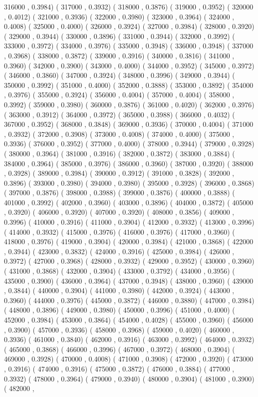 \documentclass[10pt]{article}
\begin{document}
316000 , 0.3984)  ( 317000 , 0.3932)  ( 318000 , 0.3876)  ( 319000 , 0.3952)  ( 320000 , 0.4012)  ( 321000 , 0.3936)  ( 322000 , 0.3980)  ( 323000 , 0.3964)  ( 324000 , 0.4008)  ( 325000 , 0.4000)  ( 326000 , 0.3924)  ( 327000 , 0.3984)  ( 328000 , 0.3920)  ( 329000 , 0.3944)  ( 330000 , 0.3896)  ( 331000 , 0.3944)  ( 332000 , 0.3992)  ( 333000 , 0.3972)  ( 334000 , 0.3976)  ( 335000 , 0.3948)  ( 336000 , 0.3948)  ( 337000 , 0.3968)  ( 338000 , 0.3872)  ( 339000 , 0.3916)  ( 340000 , 0.3816)  ( 341000 , 0.3960)  ( 342000 , 0.3900)  ( 343000 , 0.4000)  ( 344000 , 0.3952)  ( 345000 , 0.3972)  ( 346000 , 0.3860)  ( 347000 , 0.3924)  ( 348000 , 0.3996)  ( 349000 , 0.3944)  ( 350000 , 0.3992)  ( 351000 , 0.4000)  ( 352000 , 0.3888)  ( 353000 , 0.3892)  ( 354000 , 0.3976)  ( 355000 , 0.3924)  ( 356000 , 0.4004)  ( 357000 , 0.4004)  ( 358000 , 0.3992)  ( 359000 , 0.3980)  ( 360000 , 0.3876)  ( 361000 , 0.4020)  ( 362000 , 0.3976)  ( 363000 , 0.3912)  ( 364000 , 0.3972)  ( 365000 , 0.3988)  ( 366000 , 0.4032)  ( 367000 , 0.3952)  ( 368000 , 0.3848)  ( 369000 , 0.3936)  ( 370000 , 0.4004)  ( 371000 , 0.3932)  ( 372000 , 0.3908)  ( 373000 , 0.4008)  ( 374000 , 0.4000)  ( 375000 , 0.3936)  ( 376000 , 0.3952)  ( 377000 , 0.4000)  ( 378000 , 0.3944)  ( 379000 , 0.3928)  ( 380000 , 0.3964)  ( 381000 , 0.3916)  ( 382000 , 0.3872)  ( 383000 , 0.3884)  ( 384000 , 0.3964)  ( 385000 , 0.3976)  ( 386000 , 0.3960)  ( 387000 , 0.3920)  ( 388000 , 0.3928)  ( 389000 , 0.3984)  ( 390000 , 0.3912)  ( 391000 , 0.3828)  ( 392000 , 0.3896)  ( 393000 , 0.3980)  ( 394000 , 0.3980)  ( 395000 , 0.3928)  ( 396000 , 0.3868)  ( 397000 , 0.3876)  ( 398000 , 0.3988)  ( 399000 , 0.3876)  ( 400000 , 0.3888)  ( 401000 , 0.3992)  ( 402000 , 0.3960)  ( 403000 , 0.3896)  ( 404000 , 0.3872)  ( 405000 , 0.3920)  ( 406000 , 0.3920)  ( 407000 , 0.3920)  ( 408000 , 0.3856)  ( 409000 , 0.3996)  ( 410000 , 0.3916)  ( 411000 , 0.3904)  ( 412000 , 0.3932)  ( 413000 , 0.3996)  ( 414000 , 0.3932)  ( 415000 , 0.3976)  ( 416000 , 0.3976)  ( 417000 , 0.3960)  ( 418000 , 0.3976)  ( 419000 , 0.3904)  ( 420000 , 0.3984)  ( 421000 , 0.3868)  ( 422000 , 0.3944)  ( 423000 , 0.3832)  ( 424000 , 0.3916)  ( 425000 , 0.3984)  ( 426000 , 0.3972)  ( 427000 , 0.3968)  ( 428000 , 0.3932)  ( 429000 , 0.3952)  ( 430000 , 0.3960)  ( 431000 , 0.3868)  ( 432000 , 0.3904)  ( 433000 , 0.3792)  ( 434000 , 0.3956)  ( 435000 , 0.3900)  ( 436000 , 0.3964)  ( 437000 , 0.3948)  ( 438000 , 0.3960)  ( 439000 , 0.3844)  ( 440000 , 0.3904)  ( 441000 , 0.3980)  ( 442000 , 0.3924)  ( 443000 , 0.3960)  ( 444000 , 0.3976)  ( 445000 , 0.3872)  ( 446000 , 0.3880)  ( 447000 , 0.3984)  ( 448000 , 0.3896)  ( 449000 , 0.3980)  ( 450000 , 0.3996)  ( 451000 , 0.4000)  ( 452000 , 0.3984)  ( 453000 , 0.3864)  ( 454000 , 0.4028)  ( 455000 , 0.3960)  ( 456000 , 0.3900)  ( 457000 , 0.3936)  ( 458000 , 0.3968)  ( 459000 , 0.4020)  ( 460000 , 0.3936)  ( 461000 , 0.3840)  ( 462000 , 0.3916)  ( 463000 , 0.3992)  ( 464000 , 0.3932)  ( 465000 , 0.3868)  ( 466000 , 0.3996)  ( 467000 , 0.3972)  ( 468000 , 0.3904)  ( 469000 , 0.3928)  ( 470000 , 0.4008)  ( 471000 , 0.3908)  ( 472000 , 0.3920)  ( 473000 , 0.3916)  ( 474000 , 0.3916)  ( 475000 , 0.3872)  ( 476000 , 0.3884)  ( 477000 , 0.3932)  ( 478000 , 0.3964)  ( 479000 , 0.3940)  ( 480000 , 0.3904)  ( 481000 , 0.3900)  ( 482000 , 
\end{document}
